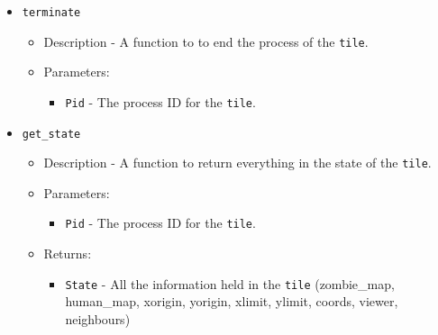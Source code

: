 \begin{itemize}
	\item {\tt terminate}
		\begin{itemize}
			\item Description - A function to to end the process of the \verb+tile+.
			\item Parameters:
				\begin{itemize}
					\item {\tt Pid} - The process ID for the \verb+tile+.
				\end{itemize}
		\end{itemize}

	\item {\tt get\_state}
		\begin{itemize}
			\item Description - A function to return everything in the state of the \verb+tile+.
			\item Parameters:
				\begin{itemize}
					\item {\tt Pid} - The process ID for the \verb+tile+.
				\end{itemize}
			\item Returns:
				\begin{itemize}
					\item {\tt State} - All the information held in the \verb+tile+ (zombie\_map, human\_map, xorigin, yorigin, xlimit, ylimit, coords, viewer, neighbours)
				\end{itemize}
		\end{itemize}	
\end{itemize}
\clearpage
\endinput